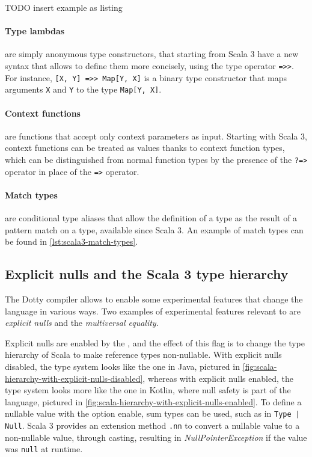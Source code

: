 TODO insert example as listing

\paragraph{Type lambdas} are simply anonymous type constructors, that starting from Scala 3 have a new syntax that allows to define them more concisely, using the type operator \texttt{=>>}.
%
For instance, \texttt{[X, Y] =>> Map[Y, X]} is a binary type constructor that maps arguments \texttt{X} and \texttt{Y} to the type \texttt{Map[Y, X]}.

\paragraph{Context functions} are functions that accept only context parameters as input. Starting with Scala 3, context functions can be treated as values thanks to context function types, which can be distinguished from normal function types by the presence of the \texttt{?=>} operator in place of the \texttt{=>} operator.

\paragraph{Match types} are conditional type aliases that allow the definition of a type as the result of a pattern match on a type, available since Scala 3.
%
An example of match types can be found in \cref{lst:scala3-match-types}.




\subsection{Explicit nulls and the Scala 3 type hierarchy} \label{chap:background->sec:scala3->subsec:type-hierarchy} \label{chap:background->sec:scala3->subsec:explicit-nulls}

The Dotty compiler allows to enable some experimental features that change the language in various ways.
%
Two examples of experimental features relevant to \this are \textit{explicit nulls} and the \textit{multiversal equality}.

Explicit nulls are enabled by the , and the effect of this flag is to change the type hierarchy of Scala to make reference types non-nullable.
%
With explicit nulls disabled, the type system looks like the one in Java, pictured in \cref{fig:scala-hierarchy-with-explicit-nulls-disabled}, whereas with explicit nulls enabled, the type system looks more like the one in Kotlin, where null safety is part of the language, pictured in \cref{fig:scala-hierarchy-with-explicit-nulls-enabled}.
%
To define a nullable value with the option enable, sum types can be used, such as in \texttt{Type | Null}.
%
Scala 3 provides an extension method \texttt{.nn} to convert a nullable value to a non-nullable value, through casting, resulting in \textit{NullPointerException} if the value was \texttt{null} at runtime.

